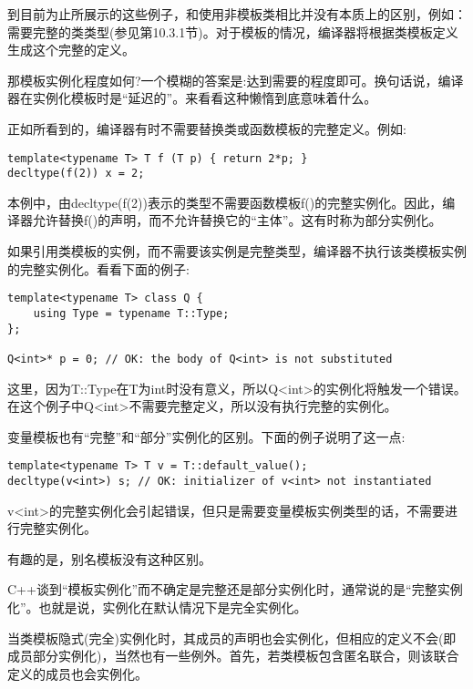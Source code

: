 
到目前为止所展示的这些例子，和使用非模板类相比并没有本质上的区别，例如：需要完整的类类型(参见第10.3.1节)。对于模板的情况，编译器将根据类模板定义生成这个完整的定义。

那模板实例化程度如何?一个模糊的答案是:达到需要的程度即可。换句话说，编译器在实例化模板时是“延迟的”。来看看这种懒惰到底意味着什么。


正如所看到的，编译器有时不需要替换类或函数模板的完整定义。例如:

\begin{lstlisting}[style=styleCXX]
template<typename T> T f (T p) { return 2*p; }
decltype(f(2)) x = 2;
\end{lstlisting}

本例中，由decltype(f(2))表示的类型不需要函数模板f()的完整实例化。因此，编译器允许替换f()的声明，而不允许替换它的“主体”。这有时称为部分实例化。

如果引用类模板的实例，而不需要该实例是完整类型，编译器不执行该类模板实例的完整实例化。看看下面的例子:

\begin{lstlisting}[style=styleCXX]
template<typename T> class Q {
	using Type = typename T::Type;
};

Q<int>* p = 0; // OK: the body of Q<int> is not substituted
\end{lstlisting}

这里，因为T::Type在T为int时没有意义，所以Q<int>的实例化将触发一个错误。在这个例子中Q<int>不需要完整定义，所以没有执行完整的实例化。

变量模板也有“完整”和“部分”实例化的区别。下面的例子说明了这一点:

\begin{lstlisting}[style=styleCXX]
template<typename T> T v = T::default_value();
decltype(v<int>) s; // OK: initializer of v<int> not instantiated
\end{lstlisting}

v<int>的完整实例化会引起错误，但只是需要变量模板实例类型的话，不需要进行完整实例化。

有趣的是，别名模板没有这种区别。

C++谈到“模板实例化”而不确定是完整还是部分实例化时，通常说的是“完整实例化”。也就是说，实例化在默认情况下是完全实例化。


当类模板隐式(完全)实例化时，其成员的声明也会实例化，但相应的定义不会(即成员部分实例化)，当然也有一些例外。首先，若类模板包含匿名联合，则该联合定义的成员也会实例化。

